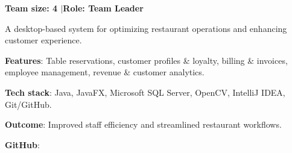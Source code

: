 
\textbf{Team size: 4 \enspace$\vert$\enspace Role: Team Leader}

\begin{entryItems}
    \item A desktop-based system for optimizing restaurant operations and enhancing customer experience.
    \item \textbf{Features}: Table reservations, customer profiles \& loyalty, billing \& invoices, employee management, revenue \& customer analytics.
    \item \textbf{Tech stack}: Java, JavaFX, Microsoft SQL Server, OpenCV, IntelliJ IDEA, Git/GitHub.
    \item \textbf{Outcome}: Improved staff efficiency and streamlined restaurant workflows.
    \item \textbf{GitHub}: 
\end{entryItems}
